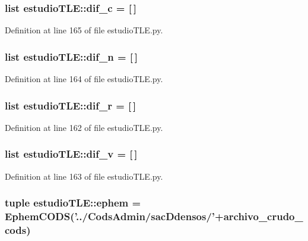 \subsubsection[{dif\-\_\-c}]{\setlength{\rightskip}{0pt plus 5cm}list {\bf estudio\-T\-L\-E\-::dif\-\_\-c} = [$\,$]}\label{namespaceestudio_t_l_e_afead10cf733b61d1340753bbcdd715f6}


\-Definition at line 165 of file estudio\-T\-L\-E.\-py.

\subsubsection[{dif\-\_\-n}]{\setlength{\rightskip}{0pt plus 5cm}list {\bf estudio\-T\-L\-E\-::dif\-\_\-n} = [$\,$]}\label{namespaceestudio_t_l_e_a516ac8d53fecd606ff13b67a800c3c67}


\-Definition at line 164 of file estudio\-T\-L\-E.\-py.

\subsubsection[{dif\-\_\-r}]{\setlength{\rightskip}{0pt plus 5cm}list {\bf estudio\-T\-L\-E\-::dif\-\_\-r} = [$\,$]}\label{namespaceestudio_t_l_e_a166a17f127ceb4b7583e66e200a5512a}


\-Definition at line 162 of file estudio\-T\-L\-E.\-py.

\subsubsection[{dif\-\_\-v}]{\setlength{\rightskip}{0pt plus 5cm}list {\bf estudio\-T\-L\-E\-::dif\-\_\-v} = [$\,$]}\label{namespaceestudio_t_l_e_a7f3f768198d910d138998f00073d4848}


\-Definition at line 163 of file estudio\-T\-L\-E.\-py.

\subsubsection[{ephem}]{\setlength{\rightskip}{0pt plus 5cm}tuple {\bf estudio\-T\-L\-E\-::ephem} = {\bf \-Ephem\-C\-O\-D\-S}('../\-Cods\-Admin/sac\-Ddensos/'+{\bf archivo\-\_\-crudo\-\_\-cods})}\label{namespaceestudio_t_l_e_a08826f20b82a757bad4d2f07e11d3b33}


